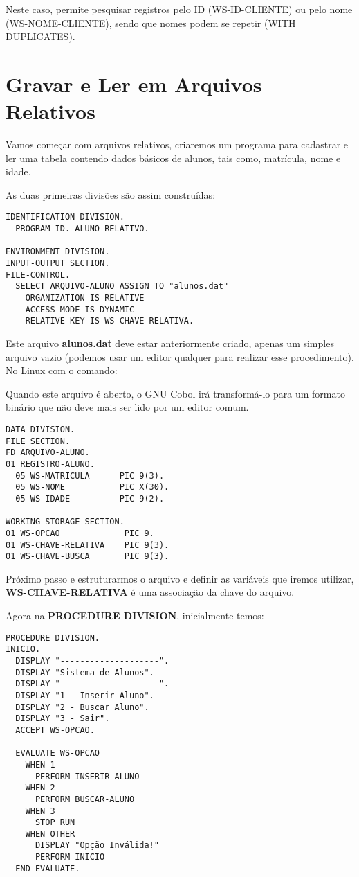 Neste caso, permite pesquisar registros pelo ID (WS-ID-CLIENTE) ou pelo nome (WS-NOME-CLIENTE), sendo que nomes podem se repetir (WITH DUPLICATES).

\section{Gravar e Ler em Arquivos Relativos}
Vamos começar com arquivos relativos, criaremos um programa para cadastrar e ler uma tabela contendo dados básicos de alunos, tais como, matrícula, nome e idade.

As duas primeiras divisões são assim construídas:
\begin{lstlisting}[]
IDENTIFICATION DIVISION.
  PROGRAM-ID. ALUNO-RELATIVO.

ENVIRONMENT DIVISION.
INPUT-OUTPUT SECTION.
FILE-CONTROL.
  SELECT ARQUIVO-ALUNO ASSIGN TO "alunos.dat"
    ORGANIZATION IS RELATIVE
    ACCESS MODE IS DYNAMIC
    RELATIVE KEY IS WS-CHAVE-RELATIVA.	
\end{lstlisting}

Este arquivo \textbf{alunos.dat} deve estar anteriormente criado, apenas um simples arquivo vazio (podemos usar um editor qualquer para realizar esse procedimento). No Linux com o comando: \\

Quando este arquivo é aberto, o GNU Cobol irá transformá-lo para um formato binário que não deve mais ser lido por um editor comum.

\begin{lstlisting}[]
DATA DIVISION.
FILE SECTION.
FD ARQUIVO-ALUNO.
01 REGISTRO-ALUNO.
  05 WS-MATRICULA      PIC 9(3).  
  05 WS-NOME           PIC X(30). 
  05 WS-IDADE          PIC 9(2).  

WORKING-STORAGE SECTION.
01 WS-OPCAO             PIC 9.
01 WS-CHAVE-RELATIVA    PIC 9(3).
01 WS-CHAVE-BUSCA       PIC 9(3).	
\end{lstlisting}

Próximo passo e estruturarmos o arquivo e definir as variáveis que iremos utilizar, \textbf{WS-CHAVE-RELATIVA} é uma associação da chave do arquivo.

Agora na \textbf{PROCEDURE DIVISION}, inicialmente temos:
\begin{lstlisting}[]
PROCEDURE DIVISION.
INICIO.
  DISPLAY "--------------------".
  DISPLAY "Sistema de Alunos".
  DISPLAY "--------------------".
  DISPLAY "1 - Inserir Aluno".
  DISPLAY "2 - Buscar Aluno".
  DISPLAY "3 - Sair".
  ACCEPT WS-OPCAO.

  EVALUATE WS-OPCAO
    WHEN 1
      PERFORM INSERIR-ALUNO
    WHEN 2
      PERFORM BUSCAR-ALUNO
    WHEN 3
      STOP RUN
    WHEN OTHER
      DISPLAY "Opção Inválida!" 
      PERFORM INICIO
  END-EVALUATE.	
\end{lstlisting}

